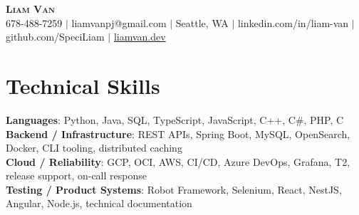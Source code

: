 \documentclass[letterpaper,11pt]{article}
\begin{document}

%
\begin{center}
    \textbf{\Huge \scshape Liam Van} \\ \vspace{1pt}
    \small 678-488-7259 $|$ \small {liamvanpj@gmail.com} $|$ Seattle, WA
 {{$|$ linkedin.com/in/liam-van} {$|$ github.com/SpeciLiam} {$|$ \href{https://liamvan.dev}{liamvan.dev}}}

\end{center}

\section{Technical Skills}
 \begin{itemize}[leftmargin=0.15in, label={}]
    \small{\item{
     \textbf{Languages}{: Python, Java, SQL, TypeScript, JavaScript, C++, C\#, PHP, C} \\
     \textbf{Backend / Infrastructure}{: REST APIs, Spring Boot, MySQL, OpenSearch, Docker, CLI tooling, distributed caching} \\
     \textbf{Cloud / Reliability}{: GCP, OCI, AWS, CI/CD, Azure DevOps, Grafana, T2, release support, on-call response} \\
     \textbf{Testing / Product Systems}{: Robot Framework, Selenium, React, NestJS, Angular, Node.js, technical documentation} \\
    }}
 \end{itemize}
%

\end{document}
